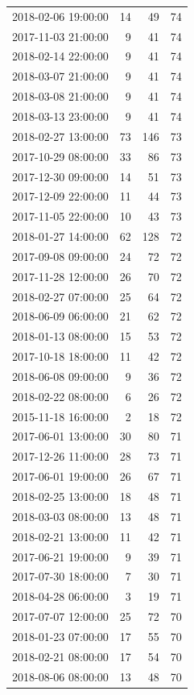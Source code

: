 \begin{tabular}{lrrr}
2018-02-06 19:00:00 & 14 & 49 & 74 \\
2017-11-03 21:00:00 & 9 & 41 & 74 \\
2018-02-14 22:00:00 & 9 & 41 & 74 \\
2018-03-07 21:00:00 & 9 & 41 & 74 \\
2018-03-08 21:00:00 & 9 & 41 & 74 \\
2018-03-13 23:00:00 & 9 & 41 & 74 \\
2018-02-27 13:00:00 & 73 & 146 & 73 \\
2017-10-29 08:00:00 & 33 & 86 & 73 \\
2017-12-30 09:00:00 & 14 & 51 & 73 \\
2017-12-09 22:00:00 & 11 & 44 & 73 \\
2017-11-05 22:00:00 & 10 & 43 & 73 \\
2018-01-27 14:00:00 & 62 & 128 & 72 \\
2017-09-08 09:00:00 & 24 & 72 & 72 \\
2017-11-28 12:00:00 & 26 & 70 & 72 \\
2018-02-27 07:00:00 & 25 & 64 & 72 \\
2018-06-09 06:00:00 & 21 & 62 & 72 \\
2018-01-13 08:00:00 & 15 & 53 & 72 \\
2017-10-18 18:00:00 & 11 & 42 & 72 \\
2018-06-08 09:00:00 & 9 & 36 & 72 \\
2018-02-22 08:00:00 & 6 & 26 & 72 \\
2015-11-18 16:00:00 & 2 & 18 & 72 \\
2017-06-01 13:00:00 & 30 & 80 & 71 \\
2017-12-26 11:00:00 & 28 & 73 & 71 \\
2017-06-01 19:00:00 & 26 & 67 & 71 \\
2018-02-25 13:00:00 & 18 & 48 & 71 \\
2018-03-03 08:00:00 & 13 & 48 & 71 \\
2018-02-21 13:00:00 & 11 & 42 & 71 \\
2017-06-21 19:00:00 & 9 & 39 & 71 \\
2017-07-30 18:00:00 & 7 & 30 & 71 \\
2018-04-28 06:00:00 & 3 & 19 & 71 \\
2017-07-07 12:00:00 & 25 & 72 & 70 \\
2018-01-23 07:00:00 & 17 & 55 & 70 \\
2018-02-21 08:00:00 & 17 & 54 & 70 \\
2018-08-06 08:00:00 & 13 & 48 & 70 \\

\end{tabular}
